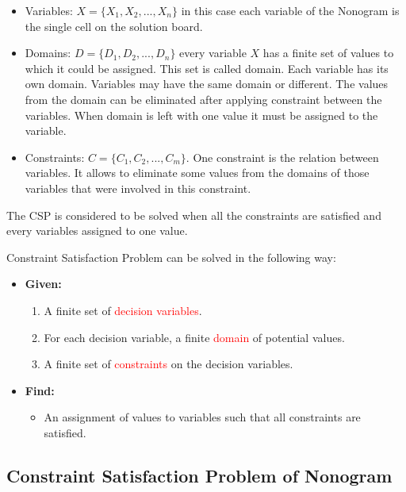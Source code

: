\begin{itemize}
	\item Variables: $X=\{X_{1}, X_{2}, ..., X_{n}\}$ in this case each variable of the Nonogram is the single cell on the solution board. 
	\item Domains: $D=\{D_{1}, D_{2}, ..., D_{n}\}$ every variable $X$ has a finite set of values to which it could be assigned. This set is called domain. Each variable has its own domain. Variables may have the same domain or different. The values from the domain can be eliminated after applying constraint between the variables. When domain is left with one value it must be assigned to the variable.
	\item Constraints: $C=\{C_{1}, C_{2}, ..., C_{m}\}$. One constraint is the relation between variables. It allows to eliminate some values from the domains of those variables that were involved in this constraint.   
\end{itemize}

The CSP is considered to be solved when all the constraints are satisfied and every variables assigned to one value. 

Constraint Satisfaction Problem can be solved in the following way:
\begin{itemize}
	\item \textbf{Given:}
	\begin{enumerate}
		\item A finite set of \textcolor{red}{decision variables}.
		\item For each decision variable, a finite \textcolor{red}{domain} of potential values.
		\item A finite set of \textcolor{red}{constraints} on the decision variables.
	\end{enumerate}


	\item \textbf{Find:}
	\begin{itemize}
		\item An assignment of values to variables such that all constraints are satisfied.
	\end{itemize}
\end{itemize}




\subsection{Constraint Satisfaction Problem of Nonogram }
\label{subsec:CSP_nonogram}

